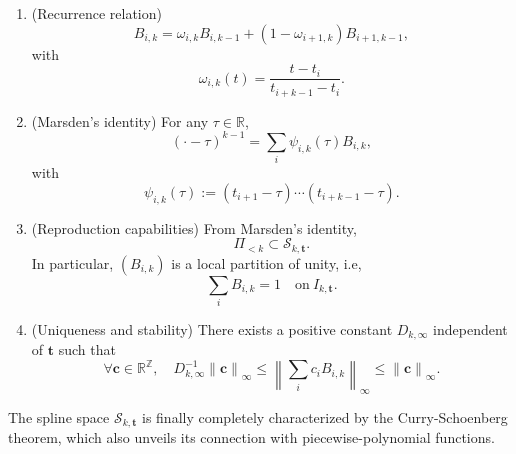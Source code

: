 \begin{prop}
  \begin{enumerate}
    \item (Recurrence relation) \begin{equation*}
	B_{i,k} = \omega_{i,k} B_{i,k-1} + (1-\omega_{i+1,k})B_{i+1, k-1},
      \end{equation*}
      with
      \begin{equation*}
	\omega_{i,k}(t) = \frac{t-t_i}{t_{i+k-1}-t_i}.
      \end{equation*}
    \item (Marsden's identity)
      For any $\tau \in \mathbb{R}$, \begin{equation*}
	{(\cdot-\tau)}^{k-1} = \sum_{i} \psi_{i,k}(\tau) B_{i,k},
      \end{equation*}
      with 
      \begin{equation*}
	\psi_{i,k}(\tau) := (t_{i+1}-\tau)\cdots(t_{i+k-1}-\tau).
      \end{equation*}
    \item (Reproduction capabilities)
      From Marsden's identity,
      \begin{equation*}
	\Pi_{<k} \subset \mathscr{S}_{k, \bm{t}}.
      \end{equation*}
      In particular, $(B_{i,k})$ is a local partition of unity, i.e,
      \begin{equation*}
	\sum_{i} B_{i,k} = 1 \quad \mathrm{on} \ I_{k, \bm{t}}.
      \end{equation*}
    \item (Uniqueness and stability)
      There exists a positive constant $D_{k, \infty}$ independent of $\bm{t}$ such that
      \begin{equation*}
	\forall \bm{c} \in \mathbb{R}^{\mathbb{Z}}, \quad D_{k, \infty}^{-1} {\|\bm{c}\|}_{\infty} \leq {\left\| 
	\sum_{i} c_{i} B_{i,k} \right\|}_{\infty} \leq {\|\bm{c}\|}_{\infty}.
      \end{equation*}
  \end{enumerate}
\end{prop}
The spline space $\mathscr{S}_{k,\bm{t}}$ is finally completely characterized by the Curry-Schoenberg theorem, which 
also unveils its connection with piecewise-polynomial functions.
